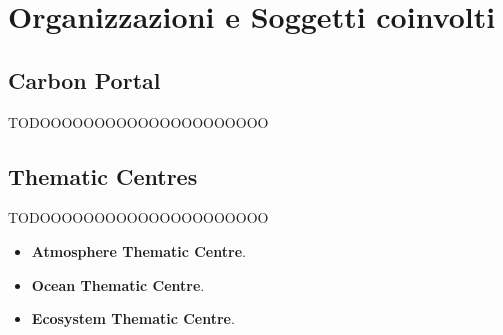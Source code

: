 \chapter{Organizzazioni e Soggetti coinvolti}
\label{chap:soggetti}

\section{Carbon Portal}
\label{section:carbonportal}
TODOOOOOOOOOOOOOOOOOOOOO

\section{Thematic Centres}
\label{section:thematic}
TODOOOOOOOOOOOOOOOOOOOOO

\begin{itemize}
    \item \textbf{Atmosphere Thematic Centre}.
    \item \textbf{Ocean Thematic Centre}.
    \item \textbf{Ecosystem Thematic Centre}.
\end{itemize}